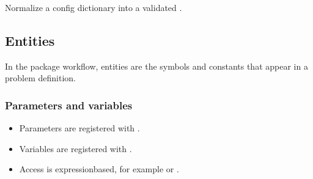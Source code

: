 \documentclass[letterpaper,10pt,english,openany,oneside]{sphinxmanual}
\begin{document}

\begin{fulllineitems}
\label{\detokenize{api/package/hyperparameters:opt.training.config.cfg_from_dict}}
\pysigstartsignatures
{}
\pysigstopsignatures
\sphinxAtStartPar
Normalize a config dictionary into a validated {\hyperref[\detokenize{api/package/hyperparameters:opt.training.config.TrainConfig}]{}}.

\end{fulllineitems}


\sphinxstepscope


\subsection{Entities}
\label{\detokenize{api/package/entities:entities}}\label{\detokenize{api/package/entities::doc}}
\sphinxAtStartPar
In the package workflow, entities are the symbols and constants that appear in a problem definition.


\subsubsection{Parameters and variables}
\label{\detokenize{api/package/entities:parameters-and-variables}}\begin{itemize}
\item {} 
\sphinxAtStartPar
Parameters are registered with {\hyperref[\detokenize{api/package/object:nlpoptnet.api.NLPOptNet.add_parameter}]{}}.

\item {} 
\sphinxAtStartPar
Variables are registered with {\hyperref[\detokenize{api/package/object:nlpoptnet.api.NLPOptNet.add_variable}]{}}.

\item {} 
\sphinxAtStartPar
Access is expression\sphinxhyphen{}based, for example  or .

\end{itemize}
\end{document}
